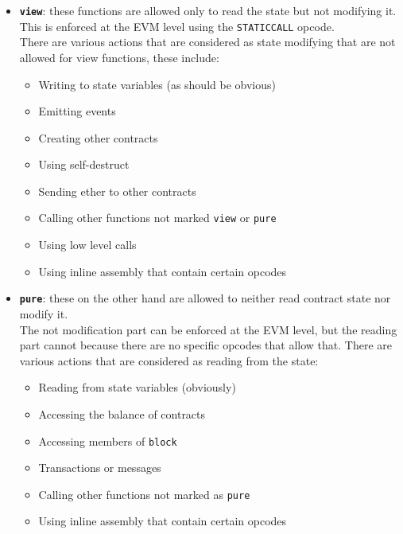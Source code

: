 \begin{itemize}
\item
  \textbf{\texttt{view}}: these functions are allowed only to read the
  state but not modifying it. This is enforced at the EVM level using
  the \texttt{STATICCALL} opcode.\\

  There are various actions that are considered as state modifying that
  are not allowed for view functions, these include:

  \begin{itemize}
  \tightlist
  \item
    Writing to state variables (as should be obvious)
  \item
    Emitting events
  \item
    Creating other contracts
  \item
    Using self-destruct
  \item
    Sending ether to other contracts
  \item
    Calling other functions not marked \texttt{view} or \texttt{pure}
  \item
    Using low level calls
  \item
    Using inline assembly that contain certain opcodes
  \end{itemize}
\item
  \textbf{\texttt{pure}}: these on the other hand are allowed to neither
  read contract state nor modify it.\\

  The not modification part can be enforced at the EVM level, but the
  reading part cannot because there are no specific opcodes that allow
  that. There are various actions that are considered as reading from
  the state:

  \begin{itemize}
  \tightlist
  \item
    Reading from state variables (obviously)
  \item
    Accessing the balance of contracts
  \item
    Accessing members of \texttt{block}
  \item
    Transactions or messages
  \item
    Calling other functions not marked as \texttt{pure}
  \item
    Using inline assembly that contain certain opcodes
  \end{itemize}
\end{itemize}

